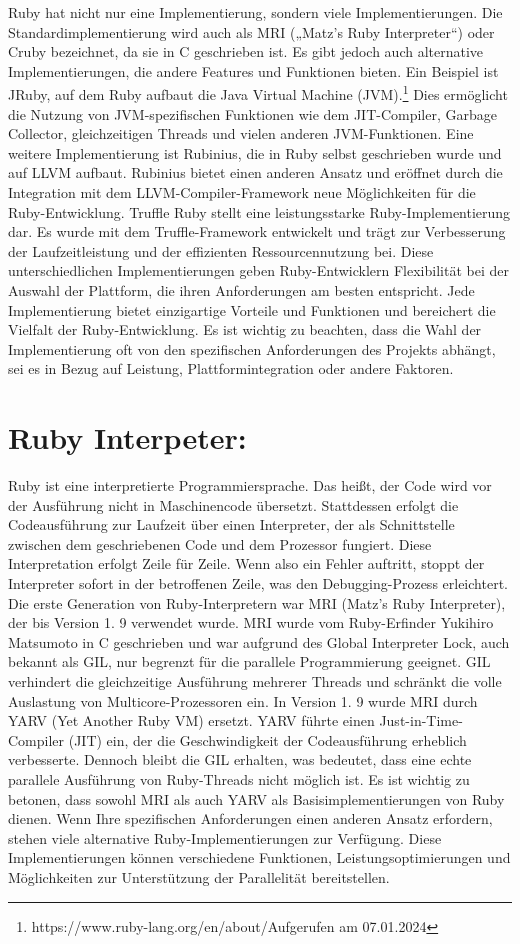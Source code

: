 \documentclass{article}
\begin{document}
Ruby hat nicht nur eine Implementierung, sondern viele Implementierungen.
Die Standardimplementierung wird auch als MRI („Matz's Ruby Interpreter“) oder Cruby bezeichnet, da sie in C geschrieben ist.
Es gibt jedoch auch alternative Implementierungen, die andere Features und Funktionen bieten.
Ein Beispiel ist JRuby, auf dem Ruby aufbaut die Java Virtual Machine (JVM).\footnote{https://www.ruby-lang.org/en/about/Aufgerufen am 07.01.2024}
Dies ermöglicht die Nutzung von JVM-spezifischen Funktionen wie dem JIT-Compiler, Garbage Collector, gleichzeitigen Threads und vielen anderen JVM-Funktionen.
Eine weitere Implementierung ist Rubinius, die in Ruby selbst geschrieben wurde und auf LLVM aufbaut.
Rubinius bietet einen anderen Ansatz und eröffnet durch die Integration mit dem LLVM-Compiler-Framework neue Möglichkeiten für die Ruby-Entwicklung.
Truffle Ruby stellt eine leistungsstarke Ruby-Implementierung dar.
Es wurde mit dem Truffle-Framework entwickelt und trägt zur Verbesserung der Laufzeitleistung und der effizienten Ressourcennutzung bei.
Diese unterschiedlichen Implementierungen geben Ruby-Entwicklern Flexibilität bei der Auswahl der Plattform, die ihren Anforderungen am besten entspricht.
Jede Implementierung bietet einzigartige Vorteile und Funktionen und bereichert die Vielfalt der Ruby-Entwicklung.
Es ist wichtig zu beachten, dass die Wahl der Implementierung oft von den spezifischen Anforderungen des Projekts abhängt, sei es in Bezug auf Leistung, Plattformintegration oder andere Faktoren.
\section*{Ruby Interpeter:}


Ruby ist eine interpretierte Programmiersprache.
Das heißt, der Code wird vor der Ausführung nicht in Maschinencode übersetzt.
Stattdessen erfolgt die Codeausführung zur Laufzeit über einen Interpreter, der als Schnittstelle zwischen dem geschriebenen Code und dem Prozessor fungiert.
Diese Interpretation erfolgt Zeile für Zeile.
Wenn also ein Fehler auftritt, stoppt der Interpreter sofort in der betroffenen Zeile, was den Debugging-Prozess erleichtert.
Die erste Generation von Ruby-Interpretern war MRI (Matz's Ruby Interpreter), der bis Version 1.
9 verwendet wurde.
MRI wurde vom Ruby-Erfinder Yukihiro Matsumoto in C geschrieben und war aufgrund des Global Interpreter Lock, auch bekannt als GIL, nur begrenzt für die parallele Programmierung geeignet.
GIL verhindert die gleichzeitige Ausführung mehrerer Threads und schränkt die volle Auslastung von Multicore-Prozessoren ein.
In Version 1.
9 wurde MRI durch YARV (Yet Another Ruby VM) ersetzt.
YARV führte einen Just-in-Time-Compiler (JIT) ein, der die Geschwindigkeit der Codeausführung erheblich verbesserte.
Dennoch bleibt die GIL erhalten, was bedeutet, dass eine echte parallele Ausführung von Ruby-Threads nicht möglich ist.
Es ist wichtig zu betonen, dass sowohl MRI als auch YARV als Basisimplementierungen von Ruby dienen.
Wenn Ihre spezifischen Anforderungen einen anderen Ansatz erfordern, stehen viele alternative Ruby-Implementierungen zur Verfügung.
Diese Implementierungen können verschiedene Funktionen, Leistungsoptimierungen und Möglichkeiten zur Unterstützung der Parallelität bereitstellen.
\end{document}
